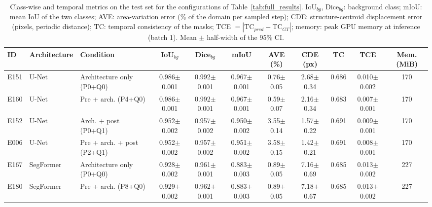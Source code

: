 \begin{table}[t]
\centering
\caption{Class-wise and temporal metrics on the test set for the configurations of Table~\ref{tab:full_results}. IoU$_{bg}$, Dice$_{bg}$: background class; mIoU: mean IoU of the two classes; AVE: area-variation error (\% of the domain per sampled step); CDE: structure-centroid displacement error (pixels, periodic distance); TC: temporal consistency of the masks; TCE $=|\mathrm{TC}_{pred}-\mathrm{TC}_{GT}|$; memory: peak GPU memory at inference (batch 1). Mean $\pm$ half-width of the 95\% CI.}
\label{tab:classwise_temporal}
\scriptsize
\setlength{\tabcolsep}{3pt}
\begin{tabularx}{\textwidth}{L{0.7cm} L{1.6cm} Y c c c c c c c c}
\toprule
\textbf{ID} & \textbf{Architecture} & \textbf{Condition} & \textbf{IoU$_{bg}$} & \textbf{Dice$_{bg}$} & \textbf{mIoU} & \textbf{AVE (\%)} & \textbf{CDE (px)} & \textbf{TC} & \textbf{TCE} & \textbf{Mem. (MiB)} \\
\midrule
E151 & U-Net & Architecture only (P0+Q0) & 0.986{\scriptsize$\pm$0.001} & 0.992{\scriptsize$\pm$0.001} & 0.967{\scriptsize$\pm$0.001} & 0.76{\scriptsize$\pm$0.05} & 2.68{\scriptsize$\pm$0.34} & 0.686 & 0.010{\scriptsize$\pm$0.002} & 170 \\
E160 & U-Net & Pre + arch. (P4+Q0) & 0.986{\scriptsize$\pm$0.001} & 0.992{\scriptsize$\pm$0.001} & 0.967{\scriptsize$\pm$0.001} & 0.59{\scriptsize$\pm$0.07} & 2.16{\scriptsize$\pm$0.34} & 0.683 & 0.007{\scriptsize$\pm$0.001} & 170 \\
E152 & U-Net & Arch. + post (P0+Q1) & 0.952{\scriptsize$\pm$0.002} & 0.957{\scriptsize$\pm$0.002} & 0.950{\scriptsize$\pm$0.002} & 3.55{\scriptsize$\pm$0.14} & 1.57{\scriptsize$\pm$0.22} & 0.691 & 0.009{\scriptsize$\pm$0.001} & 170 \\
E006 & U-Net & Pre + arch. + post (P2+Q1) & 0.952{\scriptsize$\pm$0.002} & 0.957{\scriptsize$\pm$0.002} & 0.951{\scriptsize$\pm$0.002} & 3.58{\scriptsize$\pm$0.15} & 1.42{\scriptsize$\pm$0.21} & 0.691 & 0.008{\scriptsize$\pm$0.001} & 170 \\
\addlinespace
E167 & SegFormer & Architecture only (P0+Q0) & 0.928{\scriptsize$\pm$0.002} & 0.961{\scriptsize$\pm$0.001} & 0.883{\scriptsize$\pm$0.003} & 0.89{\scriptsize$\pm$0.05} & 7.16{\scriptsize$\pm$0.69} & 0.685 & 0.013{\scriptsize$\pm$0.002} & 227 \\
E180 & SegFormer & Pre + arch. (P8+Q0) & 0.929{\scriptsize$\pm$0.002} & 0.962{\scriptsize$\pm$0.001} & 0.883{\scriptsize$\pm$0.003} & 0.89{\scriptsize$\pm$0.05} & 7.18{\scriptsize$\pm$0.67} & 0.685 & 0.013{\scriptsize$\pm$0.002} & 227 \\

\end{tabularx}
\end{table}
